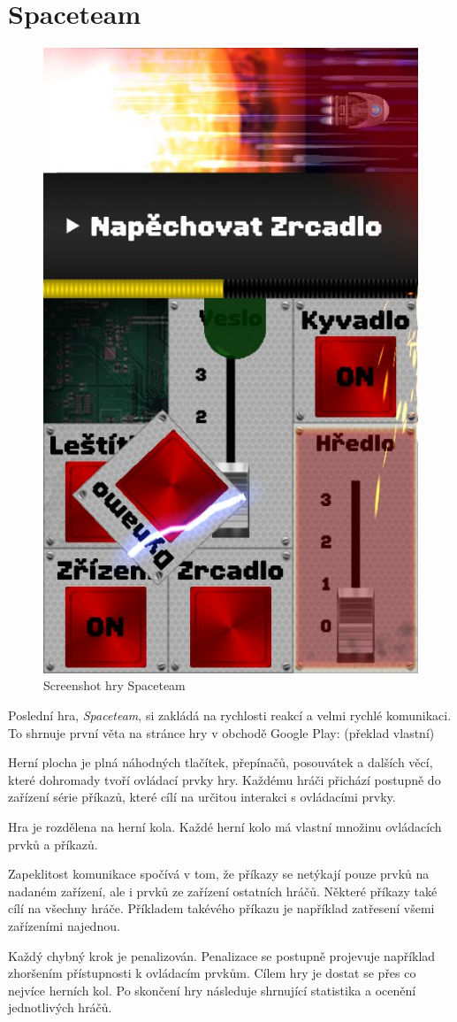 \section{Spaceteam}

\begin{figure}[ht!]
    \centering
    \includegraphics[width=0.5\linewidth]{assets/competitive-apps/spaceteam.jpg}
    \caption{Screenshot hry Spaceteam \cite{henrysmithinc_spaceteam}}
    \label{fig:spaceteam}
\end{figure}

Poslední hra, \emph{Spaceteam}, si zakládá na rychlosti reakcí a velmi rychlé
komunikaci.
To shrnuje první věta na stránce hry v obchodě Google Play:
\emph{}
\cite{henrysmithinc_spaceteam} (překlad vlastní)

Herní plocha je plná náhodných tlačítek, přepínačů, posouvátek a dalších věcí,
které dohromady tvoří ovládací prvky hry.
Každému hráči přichází postupně do zařízení série příkazů,
které cílí na určitou interakci s ovládacími prvky.

Hra je rozdělena na herní kola.
Každé herní kolo má vlastní množinu ovládacích prvků a příkazů.

Zapeklitost komunikace spočívá v tom,
že příkazy se netýkají pouze prvků na nadaném zařízení,
ale i prvků ze zařízení ostatních hráčů.
Některé příkazy také cílí na všechny hráče.
Příkladem takévého příkazu je například zatřesení všemi zařízeními najednou.

Každý chybný krok je penalizován.
Penalizace se postupně projevuje například zhoršením přístupnosti k ovládacím
prvkům.
Cílem hry je dostat se přes co nejvíce herních kol.
Po skončení hry následuje shrnující statistika a ocenění jednotlivých hráčů.

